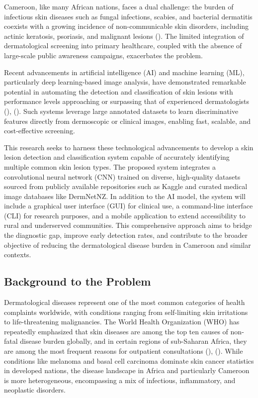 \documentclass[
  12pt,
  oneside]{article}
\begin{document}
Cameroon, like many African nations, faces a dual challenge: the burden
of infectious skin diseases such as fungal infections, scabies, and
bacterial dermatitis coexists with a growing incidence of
non-communicable skin disorders, including actinic keratosis, psoriasis,
and malignant lesions (). The limited integration of dermatological screening into primary
healthcare, coupled with the absence of large-scale public awareness
campaigns, exacerbates the problem.

Recent advancements in artificial intelligence (AI) and machine learning
(ML), particularly deep learning-based image analysis, have demonstrated
remarkable potential in automating the detection and classification of
skin lesions with performance levels approaching or surpassing that of
experienced dermatologists (), (). Such
systems leverage large annotated datasets to learn discriminative
features directly from dermoscopic or clinical images, enabling fast,
scalable, and cost-effective screening.

This research seeks to harness these technological advancements to
develop a skin lesion detection and classification system capable of
accurately identifying multiple common skin lesion types. The proposed
system integrates a convolutional neural network (CNN) trained on
diverse, high-quality datasets sourced from publicly available
repositories such as Kaggle and curated medical image databases like
DermNetNZ. In addition to the AI model, the system will include a
graphical user interface (GUI) for clinical use, a command-line
interface (CLI) for research purposes, and a mobile application to
extend accessibility to rural and underserved communities. This
comprehensive approach aims to bridge the diagnostic gap, improve early
detection rates, and contribute to the broader objective of reducing the
dermatological disease burden in Cameroon and similar contexts.

\subsection{Background to the Problem}\label{background-to-the-problem}

Dermatological diseases represent one of the most common categories of
health complaints worldwide, with conditions ranging from self-limiting
skin irritations to life-threatening malignancies. The World Health
Organization (WHO) has repeatedly emphasized that skin diseases are
among the top ten causes of non-fatal disease burden globally, and in
certain regions of sub-Saharan Africa, they are among the most frequent
reasons for outpatient consultations (), (). While
conditions like melanoma and basal cell carcinoma dominate skin cancer
statistics in developed nations, the disease landscape in Africa and
particularly Cameroon is more heterogeneous, encompassing a mix of
infectious, inflammatory, and neoplastic disorders.
\end{document}
